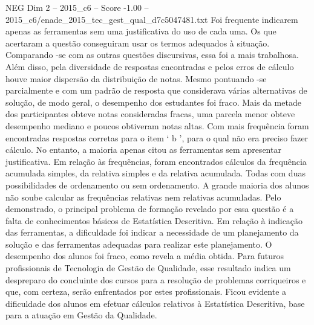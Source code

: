 \begin{textsample}{NEG Dim 2 – 2015\_c6 – Score -1.00 – 2015\_c6/enade\_2015\_tec\_gest\_qual\_d7c5047481.txt}
Foi frequente indicarem apenas as ferramentas sem uma justificativa do uso de cada uma.
Os que acertaram a questão conseguiram usar os termos adequados à situação.
Comparando -se com as outras questões discursivas, essa foi a mais trabalhosa.
Além disso, pela diversidade de respostas encontradas e pelos erros de cálculo houve maior dispersão da distribuição de notas.
Mesmo pontuando -se parcialmente e com um padrão de resposta que considerava várias alternativas de solução, de modo geral, o desempenho dos estudantes foi fraco.
Mais da metade dos participantes obteve notas consideradas fracas, uma parcela menor obteve desempenho mediano e poucos obtiveram notas altas.
Com mais frequência foram encontradas respostas corretas para o item ‘ b ’, para o qual não era preciso fazer cálculo.
No entanto, a maioria apenas citou as ferramentas sem apresentar justificativa.
Em relação às frequências, foram encontrados cálculos da frequência acumulada simples, da relativa simples e da relativa acumulada.
Todas com duas possibilidades de ordenamento ou sem ordenamento.
A grande maioria dos alunos não soube calcular as frequências relativas nem relativas acumuladas.
Pelo demonstrado, o principal problema de formação revelado por essa questão é a falta de conhecimentos básicos de Estatística Descritiva.
Em relação à indicação das ferramentas, a dificuldade foi indicar a necessidade de um planejamento da solução e das ferramentas adequadas para realizar este planejamento.
O desempenho dos alunos foi fraco, como revela a média obtida.
Para futuros profissionais de Tecnologia de Gestão de Qualidade, esse resultado indica um despreparo do concluinte dos cursos para a resolução de problemas corriqueiros e que, com certeza, serão enfrentados por estes profissionais.
Ficou evidente a dificuldade dos alunos em efetuar cálculos relativos à Estatística Descritiva, base para a atuação em Gestão da Qualidade.

\end{textsample}
